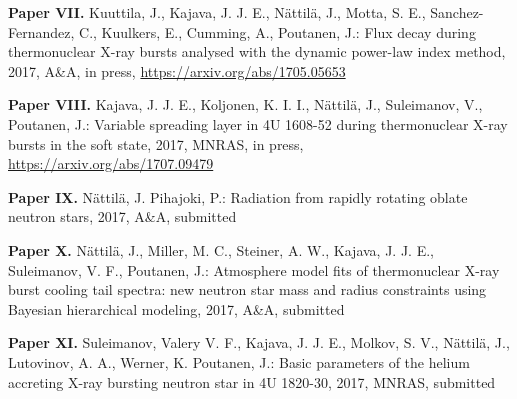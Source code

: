 \vspace{0.3cm}
\textbf{Paper VII.} Kuuttila, J., Kajava, J. J. E., Nättilä, J., Motta, S. E., Sanchez-Fernandez, C., Kuulkers, E., Cumming, A., Poutanen, J.: Flux decay during thermonuclear X-ray bursts analysed with the dynamic power-law index method, 2017, A\&A, in press, \url{https://arxiv.org/abs/1705.05653}
 

\vspace{0.3cm}
\textbf{Paper VIII.} Kajava, J. J. E., Koljonen, K. I. I., Nättilä, J., Suleimanov, V., Poutanen, J.: Variable spreading layer in 4U 1608-52 during thermonuclear X-ray bursts in the soft state, 2017, MNRAS, in press, \url{https://arxiv.org/abs/1707.09479}
 

\vspace{0.3cm}
\textbf{Paper IX.} Nättilä, J. Pihajoki, P.: Radiation from rapidly rotating oblate neutron stars, 2017, A\&A, submitted


\vspace{0.3cm}
\textbf{Paper X.} Nättilä, J., Miller, M. C., Steiner, A. W., Kajava, J. J. E., Suleimanov, V. F., Poutanen, J.: Atmosphere model fits of thermonuclear X-ray burst cooling tail spectra: new neutron star mass and radius constraints using Bayesian hierarchical modeling, 2017, A\&A, submitted


\vspace{0.3cm}
\textbf{Paper XI.} Suleimanov, Valery V. F., Kajava, J. J. E., Molkov, S. V., Nättilä, J., Lutovinov, A. A., Werner, K. Poutanen, J.: Basic parameters of the helium accreting X-ray bursting neutron star in 4U 1820-30, 2017, MNRAS, submitted



